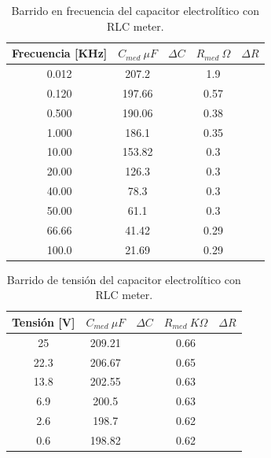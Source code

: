 \documentclass[a4paper,10pt]{article}
\begin{document}
		\begin{table}[!htp]
			\centering
			\begin{tabular}{|c|c|c|c|c|}
				\hline
				Frecuencia [KHz] & $C_{med}~\mu F$ & $\Delta C$ & 
				$R_{med}~\Omega$ & $\Delta R$ \\
				\hline
				0.012 &	207.2 &  & 1.9 & \\
				\hline
				0.120 &	197.66 &   & 0.57 & \\
				\hline
				0.500 &	190.06 &   & 0.38 & \\
				\hline
				1.000 &	186.1 &   &	0.35 & \\
				\hline
				10.00 &	153.82 &   & 0.3 & \\
				\hline
				20.00 &	126.3 &   &	0.3 & \\   
				\hline
				40.00 &	78.3 &   & 0.3 & \\
				\hline
				50.00 &	61.1 &   & 0.3 & \\
				\hline
				66.66 &	41.42 &   &	0.29 & \\
				\hline
				100.0 &	21.69 &   &	0.29 & \\
				\hline	  
			\end{tabular}
			\caption{Barrido en frecuencia del capacitor electrolítico con RLC 
			meter.} 
			\label{tab:002}
		\end{table}	
		
		\begin{table}[!htp]
			\centering
			\begin{tabular}{|c|c|c|c|c|}
				\hline
				Tensión [V] & $C_{med}~\mu F$ & $\Delta C$ & $R_{med}~K\Omega$
				& $\Delta R$\\
				\hline
				25 &	209.21 &   & 0.66 & \\
				\hline
				22.3 &	206.67 &   & 0.65 & \\
				\hline
				13.8 &	202.55 &   & 0.63 & \\
				\hline
				6.9 &	200.5 &	  & 0.63 & \\
				\hline
				2.6 &	198.7 &	  & 0.62 & \\
				\hline
				0.6 &	198.82 &   & 0.62 & \\
				\hline	  
			\end{tabular}
			\caption{Barrido de tensión del capacitor electrolítico con RLC 
			meter.} 
			\label{tab:003}
		\end{table}	
\end{document}
